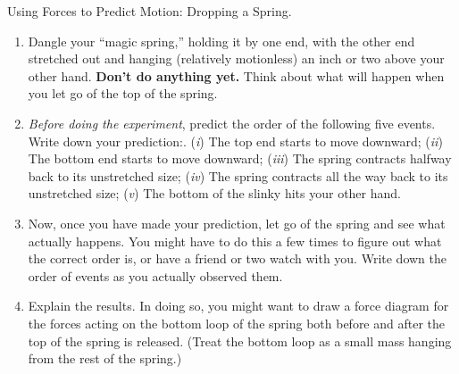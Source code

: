 \begin{aproblem}{Using Forces to Predict Motion:  Dropping a Spring.}
  \begin{enumerate}
  \item Dangle your ``magic spring,'' holding it by one end, with the
    other end stretched out and hanging (relatively motionless) an
    inch or two above your other hand.  {\bf Don't do anything yet.}
    Think about what will happen when you let go of the top of the
    spring.

  \item {\em Before doing the experiment}, predict the order of the
    following five events.  Write down your prediction:. ({\it i}) The top
    end starts to move downward; ({\it ii}) The bottom end starts to move
    downward; ({\it iii}) The spring contracts halfway back to its
    unstretched size; ({\it iv}) The spring contracts all the way back to
    its unstretched size; ({\it v}) The bottom of the slinky hits your other
    hand.

  \item Now, once you have made your prediction, let go of the spring
    and see what actually happens.  You might have to do this a few
    times to figure out what the correct order is, or have a friend or
    two watch with you.  Write down the order of events as you
    actually observed them.

  \item Explain the results.  In doing so, you might want to draw a
    force diagram for the forces acting on the bottom loop of the
    spring both before and after the top of the spring is released.
    (Treat the bottom loop as a small mass hanging from the rest of
    the spring.)
  \end{enumerate}
\end{aproblem}



